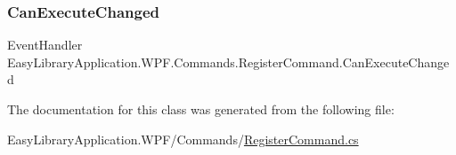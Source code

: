 \subsubsection{\texorpdfstring{Can\+Execute\+Changed}{CanExecuteChanged}}
{\footnotesize\ttfamily Event\+Handler Easy\+Library\+Application.\+W\+P\+F.\+Commands.\+Register\+Command.\+Can\+Execute\+Changed}



The documentation for this class was generated from the following file\+:\begin{DoxyCompactItemize}
\item 
Easy\+Library\+Application.\+W\+P\+F/\+Commands/\mbox{\hyperlink{_register_command_8cs}{Register\+Command.\+cs}}\end{DoxyCompactItemize}
